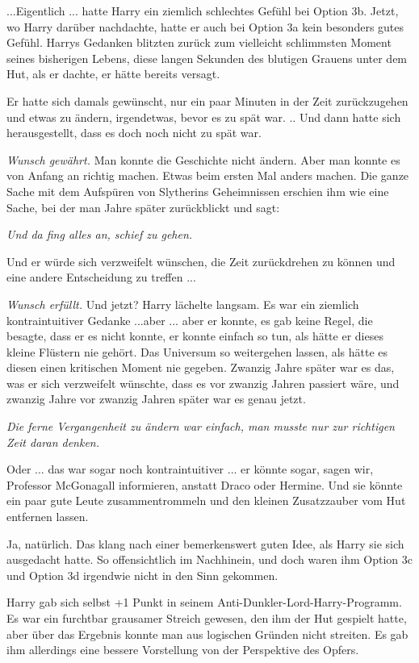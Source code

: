 ...Eigentlich ... hatte Harry ein ziemlich schlechtes Gefühl bei Option 3b.
Jetzt, wo Harry darüber nachdachte, hatte er auch bei Option 3a kein besonders
gutes Gefühl. Harrys Gedanken blitzten zurück zum vielleicht schlimmsten Moment
seines bisherigen Lebens, diese langen Sekunden des blutigen Grauens unter dem
Hut, als er dachte, er hätte bereits versagt.

Er hatte sich damals gewünscht, nur ein paar Minuten in der Zeit zurückzugehen
und etwas zu ändern, irgendetwas, bevor es zu spät war. .. Und dann hatte sich
herausgestellt, dass es doch noch nicht zu spät war.

\emph{Wunsch gewährt.} Man konnte die Geschichte nicht ändern. Aber man konnte
es von Anfang an richtig machen. Etwas beim ersten Mal anders machen. Die ganze
Sache mit dem Aufspüren von Slytherins Geheimnissen erschien ihm wie eine Sache,
bei der man Jahre später zurückblickt und sagt:

\emph{Und da fing alles an, schief zu gehen.}

Und er würde sich verzweifelt wünschen, die Zeit zurückdrehen zu können und eine
andere Entscheidung zu treffen ...

\emph{Wunsch erfüllt.} Und jetzt? Harry lächelte langsam. Es war ein ziemlich
kontraintuitiver Gedanke ...aber ... aber er konnte, es gab keine Regel, die
besagte, dass er es nicht konnte, er konnte einfach so tun, als hätte er dieses
kleine Flüstern nie gehört. Das Universum so weitergehen lassen, als hätte es
diesen einen kritischen Moment nie gegeben. Zwanzig Jahre später war es das, was
er sich verzweifelt wünschte, dass es vor zwanzig Jahren passiert wäre, und
zwanzig Jahre vor zwanzig Jahren später war es genau jetzt.

\emph{Die ferne Vergangenheit zu ändern war einfach, man musste nur zur
richtigen Zeit daran denken.}

Oder ... das war sogar noch kontraintuitiver ... er könnte sogar, sagen wir,
Professor McGonagall informieren, anstatt Draco oder Hermine. Und sie könnte ein
paar gute Leute zusammentrommeln und den kleinen Zusatzzauber vom Hut entfernen
lassen.

Ja, natürlich. Das klang nach einer bemerkenswert guten Idee, als Harry sie sich
ausgedacht hatte. So offensichtlich im Nachhinein, und doch waren ihm Option 3c
und Option 3d irgendwie nicht in den Sinn gekommen.

Harry gab sich selbst +1 Punkt in seinem Anti-Dunkler-Lord-Harry-Programm. Es
war ein furchtbar grausamer Streich gewesen, den ihm der Hut gespielt hatte,
aber über das Ergebnis konnte man aus logischen Gründen nicht streiten. Es gab
ihm allerdings eine bessere Vorstellung von der Perspektive des Opfers.

